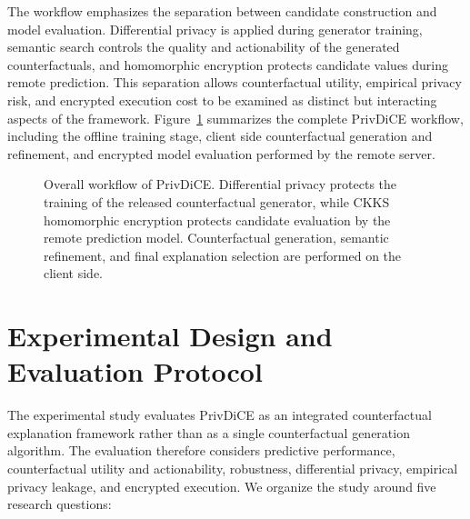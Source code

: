 \documentclass[preprint,12pt]{elsarticle}
\begin{document}
The workflow emphasizes the separation between candidate construction and
model evaluation. Differential privacy is applied during generator training,
semantic search controls the quality and actionability of the generated
counterfactuals, and homomorphic encryption protects candidate values during
remote prediction. This separation allows counterfactual utility, empirical
privacy risk, and encrypted execution cost to be examined as distinct but
interacting aspects of the framework. Figure~\ref{fig:privdice_workflow}
summarizes the complete PrivDiCE workflow, including the offline training
stage, client side counterfactual generation and refinement, and encrypted
model evaluation performed by the remote server.


\begin{figure}[!ht]
      \centering
      
      \caption{Overall workflow of PrivDiCE. Differential privacy protects the
      training of the released counterfactual generator, while CKKS homomorphic
      encryption  protects candidate evaluation by the remote prediction model.
      Counterfactual generation, semantic refinement, and final explanation
      selection are performed on the client side.}
      \label{fig:privdice_workflow}
  \end{figure}

\section{Experimental Design and Evaluation Protocol}
\label{sec:experiments}

The experimental study evaluates PrivDiCE as an integrated counterfactual
explanation framework rather than as a single counterfactual generation
algorithm. The evaluation therefore considers predictive performance,
counterfactual utility and actionability, robustness, differential privacy,
empirical privacy leakage, and encrypted execution. We organize the study
around five research questions:
\end{document}

